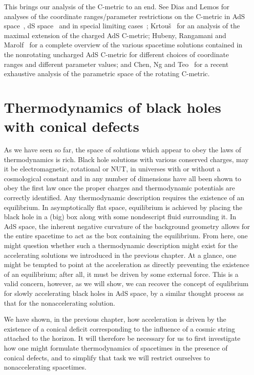 \documentclass[
twoside,
openright,
frontopenright,
]{dmathesis}
\begin{document}
This brings our analysis of the C-metric to an end. See Dias and Lemos for
analyses of the coordinate ranges/parameter restrictions on the C-metric in AdS
space~\cite{Dias:2002mi}, dS space~\cite{Dias:2003xp} and in special limiting
cases~\cite{Dias:2003up}; Krtou\v s~\cite{Krtous:2005ej} for an analysis of the
maximal extension of the charged AdS C-metric; Hubeny, Rangamani and
Marolf~\cite{Hubeny:2009kz} for a complete overview of the various spacetime
solutions contained in the nonrotating uncharged AdS C-metric for different
choices of coordinate ranges and different parameter values; and Chen, Ng and
Teo~\cite{Chen:2016rjt,Chen:2016jxv} for a recent exhaustive analysis of the
parametric space of the rotating C-metric.


\chapter{Thermodynamics of black holes with conical defects}
\label{chap:td-conical}

As we have seen so far, the space of solutions which appear to obey the laws of
thermodynamics is rich. Black hole solutions with various conserved charges, may
it be electromagnetic, rotational or NUT, in universes with or without a
cosmological constant and in any number of dimensions have all been shown to
obey the first law once the proper charges and thermodynamic potentials are
correctly identified. Any thermodynamic description requires the existence of an
equilibrium. In asymptotically flat space, equilibrium is achieved by placing
the black hole in a (big) box along with some nondescript fluid surrounding
it. In AdS space, the inherent negative curvature of the background geometry
allows for the entire spacetime to act as the box containing the
equilibrium. From here, one might question whether such a thermodynamic
description might exist for the accelerating solutions we introduced in the
previous chapter. At a glance, one might be tempted to point at the acceleration
as directly preventing the existence of an equilibrium; after all, it must be
driven by some external force. This is a valid concern, however, as we will
show, we can recover the concept of equlibrium for slowly accelerating black
holes in AdS space, by a similar thought process as that for the nonaccelerating
solution.

We have shown, in the previous chapter, how acceleration is driven by the
existence of a conical deficit corresponding to the influence of a cosmic string
attached to the horizon. It will therefore be necessary for us to first
investigate how one might formulate thermodynamics of spacetimes in the presence
of conical defects, and to simplify that task we will restrict ourselves to
nonaccelerating spacetimes.
\end{document}
